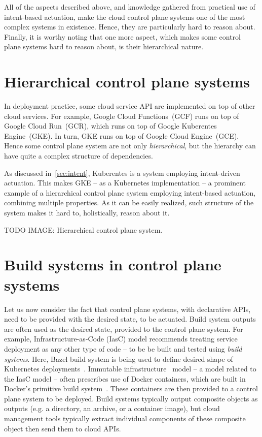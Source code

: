 All of the aspects described above, and knowledge gathered from practical use of intent-based actuation, make the cloud control plane systems one of the most complex systems in existence. Hence, they are particularly hard to reason about. Finally, it is worthy noting that one more aspect, which makes some control plane systems hard to reason about, is their hierarchical nature.


\section{Hierarchical control plane systems}

In deployment practice, some cloud service API are implemented on top of other cloud services. For example, Google Cloud Functions~(GCF) runs on top of Google Cloud Run~(GCR), which runs on top of Google Kuberentes Engine~(GKE). In turn, GKE runs on top of Google Cloud Engine~(GCE). Hence some control plane system are not only \textit{hierarchical}, but the hierarchy can have quite a complex structure of dependencies.

As discussed in~\cref{sec:intent}, Kuberentes is a system employing intent-driven actuation. This makes GKE -- as a Kubernetes implementation -- a prominent example of a hierarchical control plane system employing intent-based actuation, combining multiple properties. As it can be easily realized, such structure of the system makes it hard to, holistically, reason about it.

TODO IMAGE: Hierarchical control plane system.

\section{Build systems in control plane systems}

Let us now consider the fact that control plane systems, with declarative APIs, need to be provided with the desired state, to be actuated. Build system outputs are often used as the desired state, provided to the control plane system. For example, Infrastructure-as-Code (IasC) model recommends treating service deployment as any other type of code -- to be be built and tested using \textit{build systems}. Here, Bazel build system is being used to define desired shape of Kubernetes deployments~\cite{bazelbuildrulesk8s,stripeskycfg}. Immutable infrastructure~\cite{immutable-infra-mikkelsen2019} model -- a model related to the IasC model -- often prescribes use of Docker containers, which are built in Docker's primitive build system~\cite{Mokhov2020}. These containers are then provided to a control plane system to be deployed. Build systems typically output composite objects as outputs (e.g. a directory, an archive, or a container image), but cloud management tools typically extract individual components of these composite object then send them to cloud APIs.

